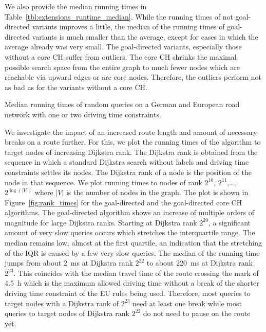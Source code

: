 We also provide the median running times in Table~\ref{tbl:extensions_runtime_median}. While the running times of not goal-directed variants improves a little, the median of the running times of goal-directed variants is much smaller than the average, except for cases in which the average already was very small. The goal-directed variants, especially those without a core CH suffer from outliers. The core CH shrinks the maximal possible search space from the entire graph to much fewer nodes which are reachable via upward edges or are core nodes. Therefore, the outliers perform not as bad as for the variants without a core CH.

\begin{table}[hbtp]
	\centering
	
	\caption{Median running times of random queries on a German and European road network with one or two driving time constraints.}
	\label{tbl:extensions_runtime_median}
\end{table}

We investigate the impact of an increased route length and amount of necessary breaks on a route further. For this, we plot the running times of the algorithm to target nodes of increasing Dijkstra rank. The Dijkstra rank is obtained from the sequence in which a standard Dijkstra search without labels and driving time constraints settles its nodes. The Dijkstra rank of a node is the position of the node in that sequence. We plot running times to nodes of rank $2^{10}$, $2^{11}$,\dots,$2^{\log(|V|)}$ where $|V|$ is the number of nodes in the graph. The plot is shown in Figure~\ref{fig:rank_times} for the goal-directed and the goal-directed core CH algorithms. The goal-directed algorithm shows an increase of multiple orders of magnitude for large Dijkstra ranks. Starting at Dijkstra rank $2^{20}$, a significant amount of very slow queries occurs which stretches the interquartile range. The median remains low, almost at the first quartile, an indication that the stretching of the IQR is caused by a few very slow queries. The median of the running time jumps from about \SI{2}{\milli\second} at Dijkstra rank $2^{22}$ to about \SI{220}{\milli\second} at Dijkstra rank $2^{23}$. This coincides with the median travel time of the route crossing the mark of \SI{4.5}{\hour} which is the maximum allowed driving time without a break of the shorter driving time constraint of the EU rules being used. Therefore, most queries to target nodes with a Dijkstra rank of $2^{23}$ need at least one break while most queries to target nodes of Dijkstra rank  $2^{22}$ do not need to pause on the route yet.

